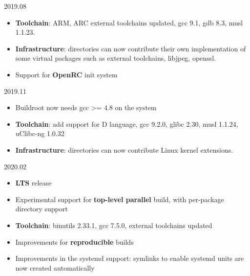 \begin{frame}{2019.08}
  \begin{itemize}
  \item {\bf Toolchain}: ARM, ARC external toolchains updated, gcc
    9.1, gdb 8.3, musl 1.1.23.
  \item {\bf Infrastructure}:  directories can now
    contribute their own implementation of some virtual packages such
    as external toolchains, libjpeg, openssl.
  \item Support for {\bf OpenRC} init system
  \end{itemize}
\end{frame}

\begin{frame}{2019.11}
  \begin{itemize}
  \item Buildroot now needs gcc >= 4.8 on the system
  \item {\bf Toolchain}: add support for D language, gcc 9.2.0, glibc
    2.30, musl 1.1.24, uClibc-ng 1.0.32
  \item {\bf Infrastructure}:  directories can now
    contribute Linux kernel extensions.
  \end{itemize}
\end{frame}

\begin{frame}{2020.02}
  \begin{itemize}
  \item {\bf LTS} release
  \item Experimental support for {\bf top-level parallel} build, with
    per-package directory support
  \item {\bf Toolchain}: binutils 2.33.1, gcc 7.5.0, external
    toolchains updated
  \item Improvements for {\bf reproducible} builds
  \item Improvements in the systemd support: symlinks to enable
    systemd units are now created automatically
  \end{itemize}
\end{frame}

